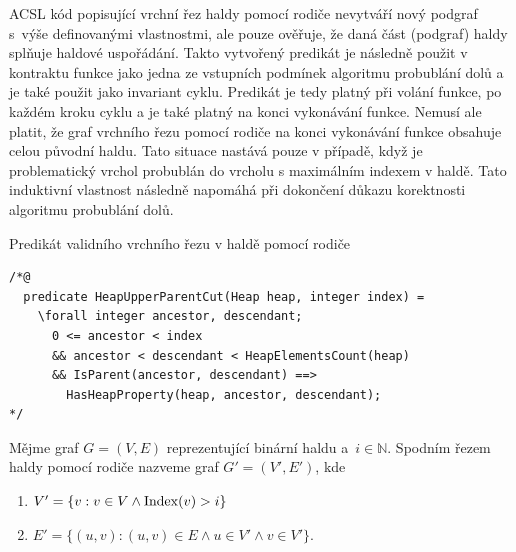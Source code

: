 ACSL kód popisující vrchní řez haldy pomocí rodiče nevytváří nový podgraf s~výše definovanými vlastnostmi, ale pouze ověřuje, že daná část (podgraf) haldy splňuje haldové uspořádání. Takto vytvořený predikát je následně použit v kontraktu funkce jako jedna ze vstupních podmínek algoritmu probublání dolů a je také použit jako invariant cyklu. Predikát je tedy platný při volání funkce, po každém kroku cyklu a je také platný na konci vykonávání funkce. Nemusí ale platit, že graf vrchního řezu pomocí rodiče na konci vykonávání funkce obsahuje celou původní haldu. Tato situace nastává pouze v případě, když je problematický vrchol probublán do vrcholu s maximálním indexem v haldě. Tato induktivní vlastnost následně napomáhá při dokončení důkazu korektnosti algoritmu probublání dolů.

\begin{listing}[H]
	\caption{Predikát validního vrchního řezu v haldě pomocí rodiče}
	\label{acsl:HeapUpperParentCut}
	\begin{verbatim}
/*@
  predicate HeapUpperParentCut(Heap heap, integer index) =
    \forall integer ancestor, descendant;
      0 <= ancestor < index
      && ancestor < descendant < HeapElementsCount(heap)
      && IsParent(ancestor, descendant) ==>
        HasHeapProperty(heap, ancestor, descendant);
*/
	\end{verbatim}
\end{listing}

\begin{definition}
	Mějme graf $G = (V, E)$ reprezentující binární haldu a~$i \in \mathbb{N}$.
	Spodním řezem haldy pomocí rodiče nazveme graf $G' = (V', E')$, kde
	\begin{enumerate}
	  \item[] $V' = \{ v: v \in V \land \operatorname{Index}(v) > i \}$
	  \item[] $E' = \{ (u, v): (u, v) \in E \land u \in V' \land v \in V' \}$.
	\end{enumerate}
\end{definition}

